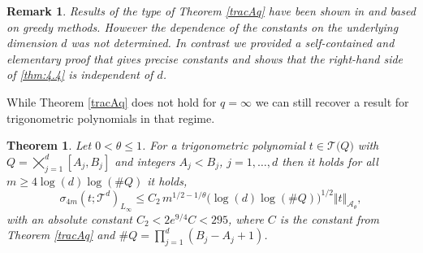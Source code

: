 \documentclass[11pt,reqno]{article}
\numberwithin{equation}{section}
\theoremstyle{definition}
\theoremstyle{plain}
\newtheorem*{rem*}{Remark}
\newtheorem{theorem}[satz]{Theorem}
\newcommand{\ca}{\ensuremath{\mathcal A}}
\newcommand{\be}{\begin{equation}}
\newcommand{\ee}{\end{equation}}
\begin{document}
\begin{rem*} \label{rem_Tem}
    Results of the type of Theorem \ref{tracAq} have been shown in \cite[Theorem 2.6]{Tem15} and \cite[Theorem 9.2.8]{Tem18_book} based on greedy methods. However the dependence of the constants on the underlying dimension \(d\) was not determined. In contrast we provided a self-contained and elementary proof that gives precise constants and shows that the right-hand side of \eqref{thm:4.4} is independent of \(d\).
\end{rem*}

While Theorem \ref{tracAq} does not hold for \(q = \infty\) we can still recover a result for trigonometric polynomials in that regime.

\begin{theorem} \label{A_infty} Let \(0 < \theta \leq 1\). For a trigonometric polynomial \(t \in\mathcal{T}\big( Q\big)\) with \( Q = \bigtimes_{j =1}^d [A_j,B_j]\) and integers \( A_j  < B_j\), \(j=1,\ldots,d\) then it holds for all \(m \geq 4\log(d) \log(\# Q)\)
 it holds,
\be
\sigma_{4m}(t;\mathcal{T}^d)_{L_\infty} \leq    C_2  \, m^{1/2-1/\theta} \big(\log(d)\log ( {\# Q} ) \big)^{1/2}\Vert t\Vert_{\ca_\theta},
\ee
with an absolute constant \(C_2 < 2 e^{9/4} C < 295\), where $C$ is the constant from Theorem \ref{tracAq} and \( {\# Q} = \prod_{j=1}^d (B_j -A_j + 1) \).
\end{theorem}
\end{document}
